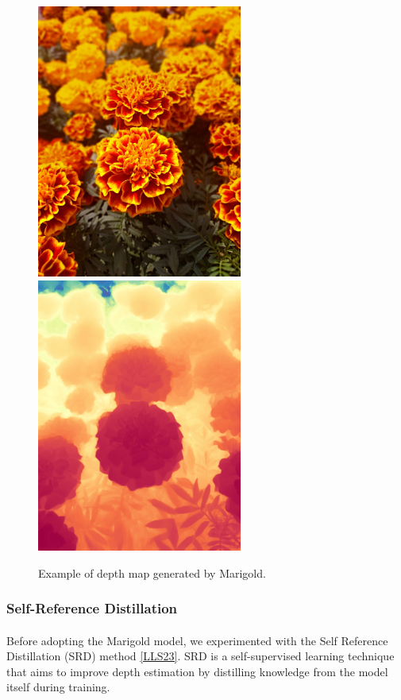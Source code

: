 \documentclass[12pt, letterpaper]{article}
\begin{document}
\begin{spacing}{1.15}
\begin{figure}[!ht]
    \begin{center}
        \includegraphics[height = 9cm]{example_0}
        \includegraphics[height = 9cm]{example_0_pred_colored}
        \caption{Example of depth map generated by Marigold.}
        \label{MrgEx}
    \end{center}
\end{figure}

\subsubsection{Self-Reference Distillation}
\paragraph{}

Before adopting the Marigold model, we experimented with the Self Reference Distillation (SRD) method \hyperlink{LRS23target} {[LLS23]}. SRD is a self-supervised learning technique that aims to improve depth estimation by distilling
knowledge from the model itself during training.


\end{spacing}
\end{document}
